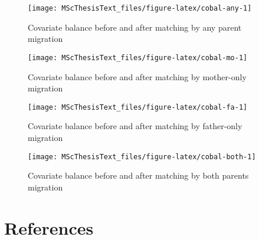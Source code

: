 \documentclass[
  man]{apa7}
\begin{document}
\newpage

\begin{figure}
\texttt{[image: MScThesisText\_files/figure-latex/cobal-any-1]} \caption{Covariate balance before and after matching by any parent migration}\label{fig:cobal-any}
\end{figure}

\begin{figure}
\texttt{[image: MScThesisText\_files/figure-latex/cobal-mo-1]} \caption{Covariate balance before and after matching by mother-only migration}\label{fig:cobal-mo}
\end{figure}

\begin{figure}
\texttt{[image: MScThesisText\_files/figure-latex/cobal-fa-1]} \caption{Covariate balance before and after matching by father-only migration}\label{fig:cobal-fa}
\end{figure}

\begin{figure}
\texttt{[image: MScThesisText\_files/figure-latex/cobal-both-1]} \caption{Covariate balance before and after matching by both parents migration}\label{fig:cobal-both}
\end{figure}

\newpage

\hypertarget{references}{%
\section{References}\label{references}}
\end{document}
